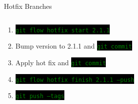 \documentclass[
14pt,
aspectratio=169,
usenames,
dvipsnames,
x11names]{beamer}
\newcommand{\code}[1]{{\small\setlength{\fboxsep}{2pt}\colorbox{black}{\textcolor{green}{\texttt{#1}}}}}
\newcommand{\shadowbox}[2]{%
  \hbox{%
    \begin{tcolorbox}[beamer,
      width=#1,
      drop fuzzy shadow=black,
      arc=0pt,
      boxsep=0pt,
      left=0pt,right=0pt,top=0pt,bottom=0pt,
      ]%
      #2
    \end{tcolorbox}
  }
}
\begin{document}
\begin{frame}{Hotfix Branches}
  \begin{columns}
    \begin{column}{.65\linewidth}
      \minipage[c][0.75\textheight][s]{\columnwidth}
      \begin{enumerate} \setlength{\itemsep}{\fill}
      \item \code{git flow hotfix start 2.1.1}
      \item Bump version to 2.1.1 and \code{git commit}
      \item Apply hot fix and \code{git commit}
      \item \code{git flow hotfix finish 2.1.1 --push}
      \item \code{git push --tags}
      \end{enumerate}
      \endminipage
    \end{column}
  \end{columns}
\end{frame}
\end{document}
